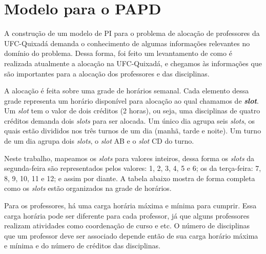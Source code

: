 \chapter{Modelo para o PAPD}
\label{cap:modelo-para-o-papd}

A construção de um modelo de PI para o problema de alocação de professores da UFC-Quixadá demanda o conhecimento de algumas informações relevantes no domínio do problema. Dessa forma, foi feito um levantamento de como é realizada atualmente a alocação na UFC-Quixadá, e chegamos às informações que são importantes para a alocação dos professores e das disciplinas. 

A alocação é feita sobre uma grade de horários semanal. Cada elemento dessa grade representa um horário disponível para alocação ao qual chamamos de \textbf{\textit{slot}}. Um \textit{slot} tem o valor de dois créditos (2 horas), ou seja, uma disciplinas de quatro créditos demanda dois \textit{slots} para ser alocada. Um único dia agrupa seis \textit{slots}, os quais estão divididos nos três turnos de um dia (manhã, tarde e noite). Um turno de um dia agrupa dois \textit{slots}, o \textit{slot} AB e o \textit{slot} CD do turno. 

Neste trabalho, mapeamos os \textit{slots} para valores inteiros, dessa forma os \textit{slots} da segunda-feira são representados pelos valores: 1, 2, 3, 4, 5 e 6; os da terça-feira: 7, 8, 9, 10, 11 e 12; e assim por diante. A tabela abaixo mostra de forma completa como os \textit{slots} estão organizados na grade de horários.

\begin{figure}[htbp]
	\centering
\end{figure}


Para os professores, há uma carga horária máxima e mínima para cumprir. Essa carga horária pode ser diferente para cada professor, já que alguns professores realizam atividades como coordenação de curso e etc. O número de disciplinas que um professor deve ser associado depende então de sua carga horário máxima e mínima e do número de créditos das disciplinas. 

